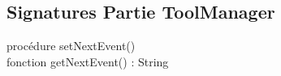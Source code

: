 \subsection{Signatures Partie ToolManager}
procédure setNextEvent()\\
\indent fonction getNextEvent() : String\\
\newpage

